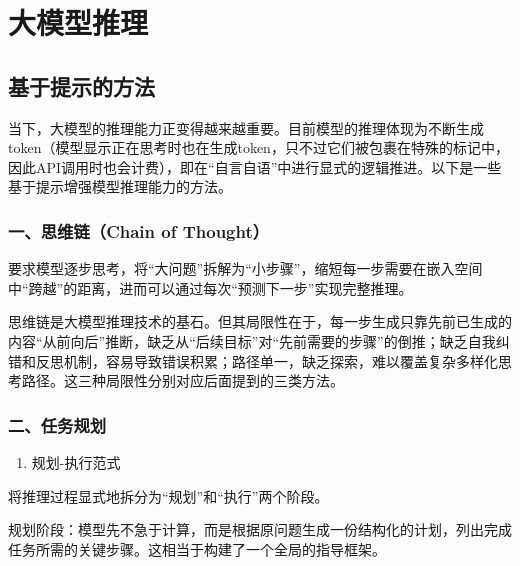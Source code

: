 \hypertarget{ux5927ux6a21ux578bux63a8ux7406}{%
\chapter{大模型推理}\label{ux5927ux6a21ux578bux63a8ux7406}}

\hypertarget{ux57faux4e8eux63d0ux793aux7684ux65b9ux6cd5}{%
\section{基于提示的方法}\label{ux57faux4e8eux63d0ux793aux7684ux65b9ux6cd5}}

当下，大模型的推理能力正变得越来越重要。目前模型的推理体现为不断生成token（模型显示正在思考时也在生成token，只不过它们被包裹在特殊的标记中，因此API调用时也会计费），即在``自言自语''中进行显式的逻辑推进。以下是一些基于提示增强模型推理能力的方法。

\hypertarget{ux4e00ux601dux7ef4ux94fechain-of-thought}{%
\subsection{一、思维链（Chain of Thought）}\label{ux4e00ux601dux7ef4ux94fechain-of-thought}}

要求模型逐步思考，将``大问题''拆解为``小步骤''，缩短每一步需要在嵌入空间中``跨越''的距离，进而可以通过每次``预测下一步''实现完整推理。

思维链是大模型推理技术的基石。但其局限性在于，每一步生成只靠先前已生成的内容``从前向后''推断，缺乏从``后续目标''对``先前需要的步骤''的倒推；缺乏自我纠错和反思机制，容易导致错误积累；路径单一，缺乏探索，难以覆盖复杂多样化思考路径。这三种局限性分别对应后面提到的三类方法。

\hypertarget{ux4e8cux4efbux52a1ux89c4ux5212}{%
\subsection{二、任务规划}\label{ux4e8cux4efbux52a1ux89c4ux5212}}

\begin{enumerate}
\def\labelenumi{\arabic{enumi}.}
\tightlist
\item
  规划-执行范式
\end{enumerate}

将推理过程显式地拆分为``规划''和``执行''两个阶段。

规划阶段：模型先不急于计算，而是根据原问题生成一份结构化的计划，列出完成任务所需的关键步骤。这相当于构建了一个全局的指导框架。

